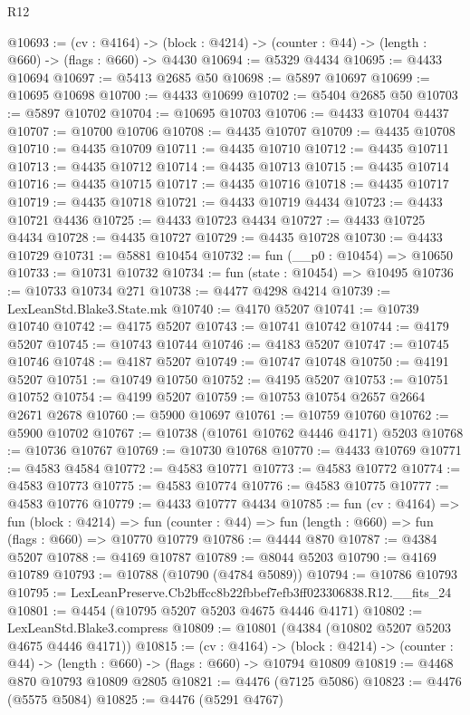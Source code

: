 \begin{lexlean}{R12}
\begin{coremodule}
@10693 := (cv : @4164) ->
  (block : @4214) -> (counter : @44) -> (length : @660) -> (flags : @660) -> @4430
@10694 := @5329 @4434
@10695 := @4433 @10694
@10697 := @5413 @2685 @50
@10698 := @5897 @10697
@10699 := @10695 @10698
@10700 := @4433 @10699
@10702 := @5404 @2685 @50
@10703 := @5897 @10702
@10704 := @10695 @10703
@10706 := @4433 @10704 @4437
@10707 := @10700 @10706
@10708 := @4435 @10707
@10709 := @4435 @10708
@10710 := @4435 @10709
@10711 := @4435 @10710
@10712 := @4435 @10711
@10713 := @4435 @10712
@10714 := @4435 @10713
@10715 := @4435 @10714
@10716 := @4435 @10715
@10717 := @4435 @10716
@10718 := @4435 @10717
@10719 := @4435 @10718
@10721 := @4433 @10719 @4434
@10723 := @4433 @10721 @4436
@10725 := @4433 @10723 @4434
@10727 := @4433 @10725 @4434
@10728 := @4435 @10727
@10729 := @4435 @10728
@10730 := @4433 @10729
@10731 := @5881 @10454
@10732 := fun (__p0 : @10454) => @10650
@10733 := @10731 @10732
@10734 := fun (state : @10454) => @10495
@10736 := @10733 @10734 @271
@10738 := @4477 @4298 @4214
@10739 := LexLeanStd.Blake3.State.mk
@10740 := @4170 @5207
@10741 := @10739 @10740
@10742 := @4175 @5207
@10743 := @10741 @10742
@10744 := @4179 @5207
@10745 := @10743 @10744
@10746 := @4183 @5207
@10747 := @10745 @10746
@10748 := @4187 @5207
@10749 := @10747 @10748
@10750 := @4191 @5207
@10751 := @10749 @10750
@10752 := @4195 @5207
@10753 := @10751 @10752
@10754 := @4199 @5207
@10759 := @10753 @10754 @2657 @2664 @2671 @2678
@10760 := @5900 @10697
@10761 := @10759 @10760
@10762 := @5900 @10702
@10767 := @10738 (@10761 @10762 @4446 @4171) @5203
@10768 := @10736 @10767
@10769 := @10730 @10768
@10770 := @4433 @10769
@10771 := @4583 @4584
@10772 := @4583 @10771
@10773 := @4583 @10772
@10774 := @4583 @10773
@10775 := @4583 @10774
@10776 := @4583 @10775
@10777 := @4583 @10776
@10779 := @4433 @10777 @4434
@10785 := fun (cv : @4164) =>
  fun (block : @4214) =>
  fun (counter : @44) => fun (length : @660) => fun (flags : @660) => @10770 @10779
@10786 := @4444 @870
@10787 := @4384 @5207
@10788 := @4169 @10787
@10789 := @8044 @5203
@10790 := @4169 @10789
@10793 := @10788 (@10790 (@4784 @5089))
@10794 := @10786 @10793
@10795 := LexLeanPreserve.Cb2bffcc8b22fbbef7efb3ff023306838.R12.__fits_24
@10801 := @4454 (@10795 @5207 @5203 @4675 @4446 @4171)
@10802 := LexLeanStd.Blake3.compress
@10809 := @10801 (@4384 (@10802 @5207 @5203 @4675 @4446 @4171))
@10815 := (cv : @4164) ->
  (block : @4214) -> (counter : @44) -> (length : @660) -> (flags : @660) -> @10794 @10809
@10819 := @4468 @870 @10793 @10809 @2805
@10821 := @4476 (@7125 @5086)
@10823 := @4476 (@5575 @5084)
@10825 := @4476 (@5291 @4767)

\end{coremodule}
\end{lexlean}

